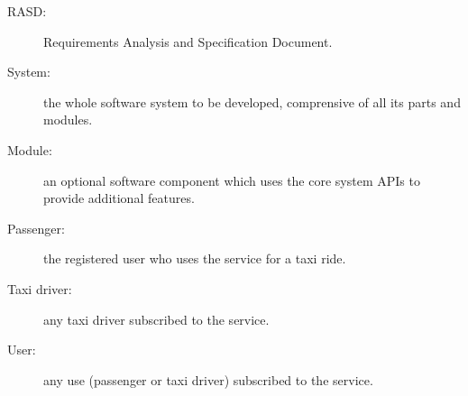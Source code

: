\begin{description}
\item[RASD:] Requirements Analysis and Specification Document.
\item[System:] the whole software system to be developed, comprensive of all its parts and modules.
\item[Module:] an optional software component which uses the core system APIs to provide additional features.
\item[Passenger:] the registered user who uses the service for a taxi ride.
\item[Taxi driver:] any taxi driver subscribed to the service.
\item[User:] any use (passenger or taxi driver) subscribed to the service.
\end{description}